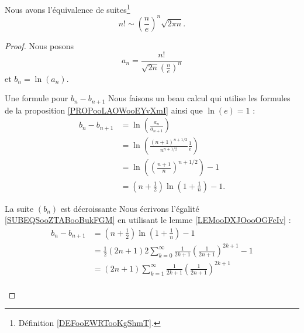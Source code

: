 \begin{lemma}        \label{LemCEoBqrP}
    Nous avons l'équivalence de suites\footnote{Définition \ref{DEFooEWRTooKgShmT}.}
    \begin{equation}
        n!\sim \left( \frac{ n }{ e } \right)^n\sqrt{2\pi n}.
    \end{equation}
\end{lemma}

\begin{proof}
    Nous posons
    \begin{equation}
        a_n=\frac{ n! }{ \sqrt{ 2n } \left( \frac{ n }{ e } \right)^n }
    \end{equation}
    et \( b_n=\ln(a_n)\).
    \begin{subproof}
        \item[Une formule pour \( b_n-b_{n+1}\)]
            Nous faisons un beau calcul qui utilise les formules de la proposition \ref{PROPooLAOWooEYvXmI} ainsi que \( \ln(e)=1\) :
            \begin{subequations}        \label{SUBEQSooZTABooBukFGM}
                \begin{align}
                    b_n-b_{n+1}&=\ln\left( \frac{ a_n }{ a_{n+1} } \right)\\
                    &=\ln\left(     \frac{ (n+1)^{n+1/2} }{ n^{n+1/2} }\frac{1}{ e }    \right)\\
                    &=\ln\left( (\frac{ n+1 }{ n })^{n+1/2} \right)-1\\
                    &=\left( n+\frac{1}{ 2 } \right)\ln(1+\frac{1}{ n })-1.
                \end{align}
            \end{subequations}
        \item[La suite \( (b_n)\) est décroissante]
            Nous écrivons l'égalité \eqref{SUBEQSooZTABooBukFGM} en utilisant le lemme \ref{LEMooDXJOooOGFcIv} :
            \begin{subequations}
                \begin{align}
                    b_n-b_{n+1}&=(n+\frac{ 1 }{2})\ln(1+\frac{1}{ n })-1\\
                    &=\frac{ 1 }{2}(2n+1)2\sum_{k=0}^{\infty}\frac{1}{ 2k+1 }\left( \frac{1}{ 2n+1 } \right)^{2k+1}-1\\
                    &=(2n+1)\sum_{k=1}^{\infty}\frac{1}{ 2k+1 }\left( \frac{1}{ 2n+1 } \right)^{2k+1}\\

\end{align}
\end{subequations}
\end{subproof}
\end{proof}
